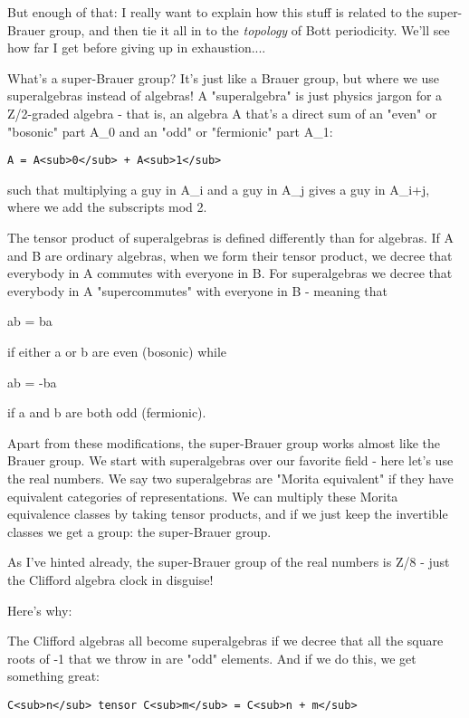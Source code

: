 But enough of that: I really want to explain how this stuff is related
to the super-Brauer group, and then tie it all in to the \emph{topology} 
of Bott 
periodicity.  We'll see how far I get before giving up in exhaustion....

What's a super-Brauer group?  It's just like a Brauer group, but where we
use superalgebras instead of algebras!  A "superalgebra" is just physics 
jargon for a Z/2-graded algebra - that is, an algebra A that's a direct 
sum of an "even" or "bosonic" part A_{0} 
and an "odd" or "fermionic" part A_{1}:

\begin{verbatim}
A = A<sub>0</sub> + A<sub>1</sub>
\end{verbatim}
    
such that multiplying a guy in A_{i} 
and a guy in A_{j} gives a guy in A_{i+j},
where we add the subscripts mod 2.  
 
The tensor product of superalgebras is defined differently than for algebras.
If A and B are ordinary algebras, when we form their tensor product, we
decree that everybody in A commutes with everyone in B.   For superalgebras
we decree that everybody in A "supercommutes" with everyone in B - meaning 
that

ab = ba

if either a or b are even (bosonic) while 

ab = -ba

if a and b are both odd (fermionic).

Apart from these modifications, the super-Brauer group works almost like the
Brauer group.  We start with superalgebras over our favorite field - here 
let's use the real numbers.  We say two superalgebras are "Morita equivalent" 
if they have equivalent categories of representations.  We can multiply
these Morita equivalence classes by taking tensor products, and if we just 
keep the invertible classes we get a group: the super-Brauer group.

As I've hinted already, the super-Brauer group of the real numbers is Z/8 - 
just the Clifford algebra clock in disguise!

Here's why:

The Clifford algebras all become superalgebras if we decree that all the
square roots of -1 that we throw in are "odd" elements.  And if we do this,
we get something great:

\begin{verbatim}
C<sub>n</sub> tensor C<sub>m</sub> = C<sub>n + m</sub>
\end{verbatim}
    
